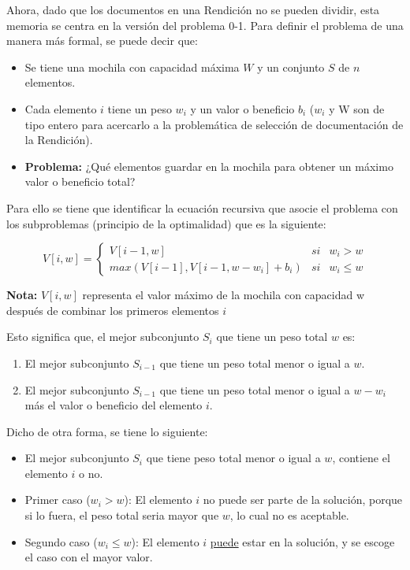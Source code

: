 Ahora, dado que los documentos en una Rendición no se pueden dividir, esta memoria se centra en la versión del problema 0-1. Para definir el problema de una manera más formal, se puede decir que:

\begin{itemize}
    \item Se tiene una mochila con capacidad máxima $W$ y un conjunto $S$ de $n$ elementos.
    \item Cada elemento $i$ tiene un peso $w_i$ y un valor o beneficio $b_i$ ($w_i$ y W son de tipo entero para acercarlo a la problemática de selección de documentación de la Rendición).
    \item \textbf{Problema:} ¿Qué elementos guardar en la mochila para obtener un máximo valor o beneficio total?
\end{itemize}

Para ello se tiene que identificar la ecuación recursiva que asocie el problema con los subproblemas (principio de la optimalidad) que es la siguiente:

\begin{equation}
    V[i,w]  = \left\lbrace
    \begin{array}{lcc}
        V[i-1,w] & si & w_i>w\\
        max(V[i-1],V[i-1,w-w_i]+b_i) & si & w_i \leq w
    \end{array}
    \right.
\end{equation}

\textbf{Nota:} $V[i,w]$ representa el valor máximo de la mochila con capacidad w después de combinar los primeros elementos $i$

Esto significa que, el mejor subconjunto $S_i$ que tiene un peso total $w$ es:

\begin{enumerate}
    \item El mejor subconjunto $S_{i-1}$ que tiene un peso total menor o igual a $w$.
    \item El mejor subconjunto $S_{i-1}$ que tiene un peso total menor o igual a $w-w_i$ más el valor o beneficio del elemento $i$.
\end{enumerate}

Dicho de otra forma, se tiene lo siguiente:
\begin{itemize}
    \item El mejor subconjunto $S_i$ que tiene peso total menor o igual a $w$, contiene el elemento $i$ o no.
    \item Primer caso ($w_i>w$): El elemento $i$ no puede ser parte de la solución, porque si lo fuera, el peso total seria mayor que $w$, lo cual no es aceptable.
    \item Segundo caso ($w_i \leq w$): El elemento $i$ \underline{puede} estar en la solución, y se escoge el caso con el mayor valor.
\end{itemize}


